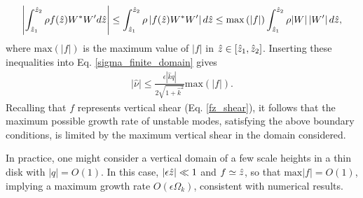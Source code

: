 \begin{align}
  \left|\int_{\hat{z}_1}^{\hat{z}_2}\rho
    f(\hat{z}) W^*W^\prime d\hat{z}\right|\leq \int_{\hat{z}_1}^{\hat{z}_2}\rho
  \left|f(\hat{z})W^*W^\prime \right|d\hat{z}
  \leq
  \mathrm{max}\left(|f|\right)\int_{\hat{z}_1}^{\hat{z}_2}\rho
  |W|\left|W^\prime \right|d\hat{z},
\end{align}
where $\mathrm{max}(|f|)$ is the maximum value of $|f|$ in
$\hat{z}\in[\hat{z}_1,\hat{z}_2]$. Inserting these inequalities into
Eq. \ref{sigma_finite_domain} gives
\begin{align}\label{max_growth}
  |\hat{\nu}|\leq
  \frac{\epsilon |\hat{k} q|}{2\sqrt{1+\hat{k}^2}}\mathrm{max}(|f|). 
\end{align}
Recalling that $f$ represents vertical shear (Eq. \ref{fz_shear}), it
follows that the maximum possible growth rate of unstable modes,
satisfying the above boundary conditions, is limited by the maximum
vertical shear in the domain considered.  

In practice, one might consider a vertical domain of a few scale 
heights in a thin disk with $|q|=O(1)$. In this case, $|\epsilon\hat{z}|\ll1$ and  
$f\simeq \hat{z}$, so that $\mathrm{max}|f| = O(1)$, implying a
maximum growth rate $O(\epsilon \Omega_k)$, consistent with numerical
results. 


